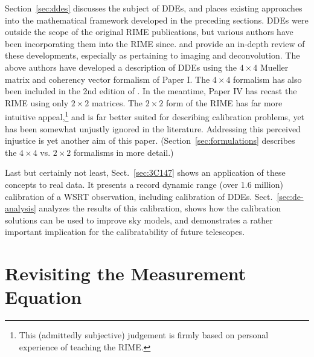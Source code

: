 \documentclass[]{aa}
\begin{document}
Section~\ref{sec:ddes} discusses the subject of DDEs, and places existing approaches into the mathematical framework developed in the preceding sections. DDEs were outside the scope of the original RIME publications, but various authors have been incorporating them into the RIME since. \citet{Rau:DDEs} and \citet{SB:calibration-low-freq} provide an in-depth review of these developments, especially as pertaining to imaging and deconvolution. The above authors have developed a description of DDEs using the $4\times4$ Mueller matrix and coherency vector formalism of Paper I. The $4\times4$ formalism has also been included in the 2nd edition of \citet*[Sect.~4.8]{tms}. In the meantime, Paper IV has recast the RIME using only $2\times2$ matrices. The $2\times2$ form of the RIME has far more intuitive appeal,\footnote{This (admittedly subjective) judgement is firmly based on personal experience of teaching the RIME.} and is far better suited for describing calibration problems, yet has been somewhat unjustly ignored in the literature. Addressing this perceived injustice is yet another aim of this paper. (Section~\ref{sec:formulations} describes the $4\times4$ vs. $2\times2$ formalisms in more detail.)

Last but certainly not least, Sect.~\ref{sec:3C147} shows an application of these concepts to real data. It presents a record dynamic range (over 1.6 million) calibration of a WSRT observation, including calibration of DDEs. Sect.~\ref{sec:de-analysis} analyzes the results of this calibration, shows how the calibration solutions can be used to improve sky models, and demonstrates a rather important implication for the calibratability of future telescopes.

\section{\label{sec:derivation}Revisiting the Measurement Equation}
\end{document}

